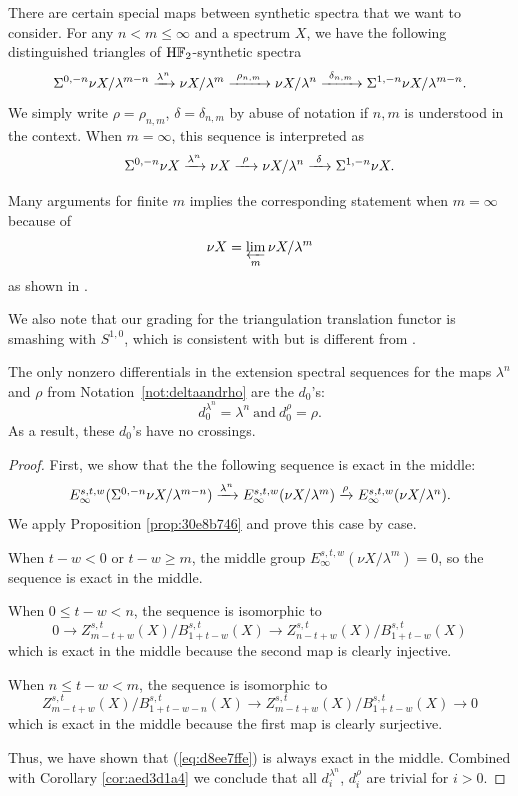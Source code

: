 \documentclass{amsart}
\numberwithin{equation}{section}
\newcommand{\HF}{\mathrm{H}\bF_2}
\begin{document}
\begin{notation} \label{not:deltaandrho}
There are certain special maps between synthetic spectra that we want to consider. For any $n<m\le \infty$ and a spectrum $X$, we have the following  distinguished triangles of $\HF$-synthetic spectra
$$\Sigma^{0,-n}\nu X/\lambda^{m-n}\xrightarrow{\lambda^n} \nu X/\lambda^m\xrightarrow{~\rho_{n,m}~} \nu X/\lambda^n\xrightarrow{~\delta_{n,m}~} \Sigma^{1,-n}\nu X/\lambda^{m-n}.$$
We simply write $\rho=\rho_{n,m}$, $\delta=\delta_{n,m}$ by abuse of notation if $n,m$ is understood in the context.
When $m=\infty$, this sequence is interpreted  as
$$\Sigma^{0,-n}\nu X\xrightarrow{\lambda^n} \nu X\xrightarrow{~\rho~} \nu X/\lambda^n\xrightarrow{~\delta~} \Sigma^{1,-n}\nu X.$$

Many arguments for finite $m$ implies the corresponding statement when $m=\infty$ because of
$$\nu X=\varprojlim_{m} \nu X/\lambda^m$$
as shown in \cite[Proposition A.13]{BHS}.

We also note that our grading for the triangulation translation functor is smashing with $S^{1,0}$, which is consistent with \cite[Appendix A]{BHS} but is different from \cite[Section 7]{BurklundXu}.
\end{notation}


\begin{proposition}\label{prop:9770ae6e} 
The only nonzero differentials in the extension spectral sequences for the maps $\lambda^n$ and $\rho$ from Notation~\ref{not:deltaandrho} are the $d_0$'s:
$$d^{\lambda^n}_0=\lambda^n \ \text{and} \ d^{\rho}_0=\rho.$$ 
As a result, these $d_0$'s have no crossings.
\end{proposition}
\begin{proof}
    First, we show that the the following sequence is exact in the middle:
    \begin{equation}\label{eq:d8ee7ffe}
        \scalebox{1}{$E_\infty^{s,t,w}(\Sus^{0,-n}\nu X/\lambda^{m-n})\fto{\lambda^n} E_\infty^{s,t,w}(\nu X/\lambda^{m})\fto{\rho} E_\infty^{s,t,w}(\nu X/\lambda^{n})$}.
    \end{equation}
    We apply Proposition \ref{prop:30e8b746} and prove this case by case.

    When $t-w<0$ or $t-w\ge m$, the middle group $E_\infty^{s,t,w}(\nu X/\lambda^{m}) = 0$, so the sequence is exact in the middle.
    
    When $0\le t-w<n$, the sequence is isomorphic to
    $$0\to Z^{s,t}_{m-t+w}(X)/B^{s,t}_{1+t-w}(X)\to Z^{s,t}_{n-t+w}(X)/B^{s,t}_{1+t-w}(X)$$
    which is exact in the middle because the second map is clearly injective.

    When $n\le t-w<m$, the sequence is isomorphic to
    $$Z^{s,t}_{m-t+w}(X)/B^{s,t}_{1+t-w-n}(X)\to Z^{s,t}_{m-t+w}(X)/B^{s,t}_{1+t-w}(X)\to 0$$
    which is exact in the middle because the first map is clearly surjective.

    Thus, we have shown that (\ref{eq:d8ee7ffe}) is always exact in the middle. Combined with Corollary \ref{cor:aed3d1a4} we conclude that all $d^{\lambda^n}_i$, $d^{\rho}_i$ are trivial for $i>0$.
\end{proof}
\end{document}
